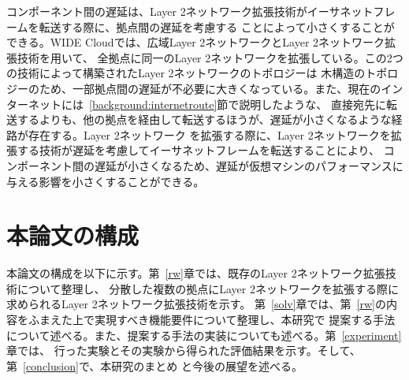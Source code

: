 コンポーネント間の遅延は、Layer 2ネットワーク拡張技術がイーサネットフレームを転送する際に、拠点間の遅延を考慮する
ことによって小さくすることができる。WIDE Cloudでは、広域Layer 2ネットワークとLayer 2ネットワーク拡張技術を用いて、
全拠点に同一のLayer 2ネットワークを拡張している。この2つの技術によって構築されたLayer 2ネットワークのトポロジーは
木構造のトポロジーのため、一部拠点間の遅延が不必要に大きくなっている。また、現在のインターネットには~\ref{background:internetroute}節で説明したような、
直接宛先に転送するよりも、他の拠点を経由して転送するほうが、遅延が小さくなるような経路が存在する。Layer 2ネットワーク
を拡張する際に、Layer 2ネットワークを拡張する技術が遅延を考慮してイーサネットフレームを転送することにより、
コンポーネント間の遅延が小さくなるため、遅延が仮想マシンのパフォーマンスに与える影響を小さくすることができる。

\section{本論文の構成}

本論文の構成を以下に示す。第~\ref{rw}章では、既存のLayer 2ネットワーク拡張技術について整理し、
分散した複数の拠点にLayer 2ネットワークを拡張する際に求められるLayer 2ネットワーク拡張技術を示す。
第~\ref{solv}章では、第~\ref{rw}の内容をふまえた上で実現すべき機能要件について整理し、本研究で
提案する手法について述べる。また、提案する手法の実装についても述べる。第~\ref{experiment}章では、
行った実験とその実験から得られた評価結果を示す。そして、第~\ref{conclusion}で、本研究のまとめ
と今後の展望を述べる。

